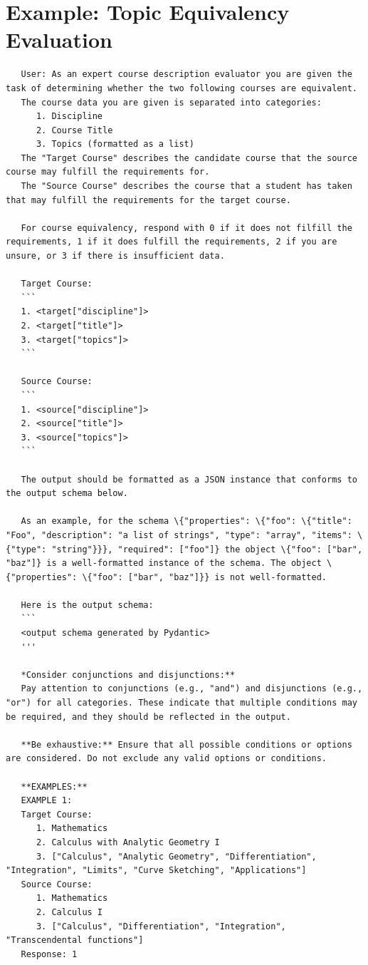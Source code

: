 \section{Example: Topic Equivalency Evaluation}\label{app:topicequivprompt}

\begin{lstlisting}
   User: As an expert course description evaluator you are given the task of determining whether the two following courses are equivalent.
   The course data you are given is separated into categories:
      1. Discipline
      2. Course Title
      3. Topics (formatted as a list)
   The "Target Course" describes the candidate course that the source course may fulfill the requirements for.
   The "Source Course" describes the course that a student has taken that may fulfill the requirements for the target course.

   For course equivalency, respond with 0 if it does not filfill the requirements, 1 if it does fulfill the requirements, 2 if you are unsure, or 3 if there is insufficient data.

   Target Course:
   ```
   1. <target["discipline"]>
   2. <target["title"]>
   3. <target["topics"]>
   ```

   Source Course:
   ```
   1. <source["discipline"]>
   2. <source["title"]>
   3. <source["topics"]>
   ```

   The output should be formatted as a JSON instance that conforms to the output schema below.

   As an example, for the schema \{"properties": \{"foo": \{"title": "Foo", "description": "a list of strings", "type": "array", "items": \{"type": "string"}}}, "required": ["foo"]} the object \{"foo": ["bar", "baz"]} is a well-formatted instance of the schema. The object \{"properties": \{"foo": ["bar", "baz"]}} is not well-formatted.

   Here is the output schema:
   ```
   <output schema generated by Pydantic>
   '''

   *Consider conjunctions and disjunctions:**
   Pay attention to conjunctions (e.g., "and") and disjunctions (e.g., "or") for all categories. These indicate that multiple conditions may be required, and they should be reflected in the output.

   **Be exhaustive:** Ensure that all possible conditions or options are considered. Do not exclude any valid options or conditions.

   **EXAMPLES:**
   EXAMPLE 1:
   Target Course:
      1. Mathematics
      2. Calculus with Analytic Geometry I
      3. ["Calculus", "Analytic Geometry", "Differentiation", "Integration", "Limits", "Curve Sketching", "Applications"]
   Source Course:
      1. Mathematics
      2. Calculus I
      3. ["Calculus", "Differentiation", "Integration", "Transcendental functions"]
   Response: 1


\end{lstlisting}
